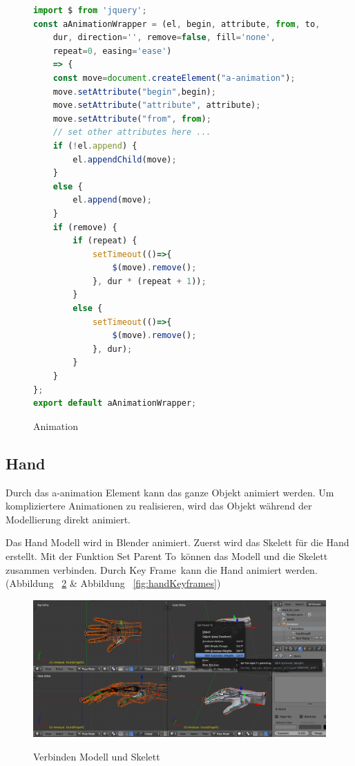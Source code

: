 \begin{figure}[ht]
\vspace*{1em}
\centering
\caption[Animation]{Animation}
\begin{lstlisting}[language=JavaScript, style=htmlcssjs]
import $ from 'jquery';
const aAnimationWrapper = (el, begin, attribute, from, to,
    dur, direction='', remove=false, fill='none',
    repeat=0, easing='ease') 
    => {
    const move=document.createElement("a-animation");
    move.setAttribute("begin",begin);
    move.setAttribute("attribute", attribute);
    move.setAttribute("from", from);
    // set other attributes here ...
    if (!el.append) {
        el.appendChild(move);
    }
    else {
        el.append(move);
    }
    if (remove) {
        if (repeat) {
            setTimeout(()=>{
                $(move).remove();
            }, dur * (repeat + 1));
        }
        else {
            setTimeout(()=>{
                $(move).remove();
            }, dur);
        }
    }
};
export default aAnimationWrapper;
\end{lstlisting}
\label{fig:aAnimation} 
\end{figure}
 
 \subsection{Hand}
 
 Durch das {\selectfont a-animation} Element kann das ganze Objekt animiert werden. Um kompliziertere Animationen zu realisieren, wird das Objekt während der Modellierung direkt animiert.
 
 Das Hand Modell wird in Blender animiert. Zuerst wird das Skelett für die Hand erstellt. Mit der Funktion \glqq Set Parent To\grqq\ können das Modell und die Skelett zusammen verbinden. Durch \glqq Key Frame\grqq\ kann die Hand animiert werden. (Abbildung ~\ref{fig:handSetParentTo} \& Abbildung ~\ref{fig:handKeyframes})
 
\begin{figure}[ht]
\vspace*{1em}
\centering
\caption[Verbinden Modell und Skelett]{Verbinden Modell und Skelett}
\includegraphics[width=\textwidth]{images/handSetParentTo.png}
\label{fig:handSetParentTo} 
\end{figure}

